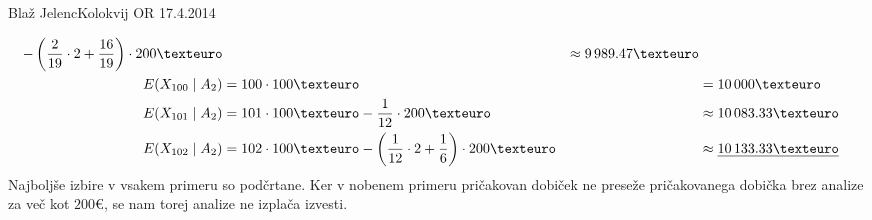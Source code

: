 \begin{naloga}{Blaž Jelenc}{Kolokvij OR 17.4.2014}
\begin{odgovor}
\begin{enumerate}[(a)]
\begin{alignat*}{2}
- \left({2 \over 19} \cdot 2 + {16 \over 19}\right) \cdot 200 €
&&\approx 9\,989.47 € \\
E(X_{100} \;|\; A_2) &= 100 \cdot 100 € &&= 10\,000 € \\
E(X_{101} \;|\; A_2) &= 101 \cdot 100 € - {1 \over 12} \cdot 200 €
&&\approx 10\,083.33 € \\
E(X_{102} \;|\; A_2) &= 102 \cdot 100 €
- \left({1 \over 12} \cdot 2 + {1 \over 6}\right) \cdot 200 €
&&\approx \underline{10\,133.33 €}
\end{alignat*}
Najboljše izbire v vsakem primeru so podčrtane.
Ker v nobenem primeru pričakovan dobiček
ne preseže pričakovanega dobička brez analize za več kot $200 €$,
se nam torej analize ne izplača izvesti.
\end{enumerate}
\end{odgovor}
\end{naloga}
